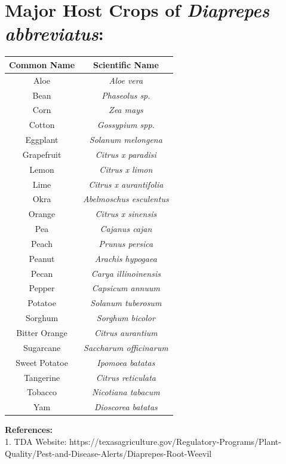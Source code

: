 \documentclass[12pt]{exam}
\begin{document}
\section*{Major Host Crops of \textit{Diaprepes abbreviatus}:} %
\begin{center}
\begin{tabular}{ |c|c| } 
 \hline
 \textbf{Common Name} & \textbf{Scientific Name }\\ 
 \hline
 Aloe & \textit{Aloe vera} \\ 
 \hline
 Bean & \textit{Phaseolus sp.} \\ 
 \hline
 Corn & \textit{Zea mays} \\ 
 \hline
 Cotton & \textit{Gossypium spp.} \\
 \hline
 Eggplant & \textit{Solanum melongena} \\ 
 \hline
 Grapefruit & \textit{Citrus x paradisi} \\ 
 \hline
 Lemon & \textit{Citrus x limon} \\ 
 \hline
 Lime & \textit{Citrus x aurantifolia} \\ 
 \hline
 Okra & \textit{Abelmoschus esculentus} \\
 \hline
 Orange & \textit{Citrus x sinensis} \\ 
 \hline
 Pea & \textit{Cajanus cajan} \\ 
 \hline
 Peach & \textit{Prunus persica} \\
 \hline
 Peanut & \textit{Arachis hypogaea} \\
 \hline
 Pecan & \textit{Carya illinoinensis} \\
 \hline
 Pepper & \textit{Capsicum annuum} \\
 \hline
 Potatoe & \textit{Solanum tuberosum} \\
 \hline
 Sorghum & \textit{Sorghum bicolor} \\
 \hline
 Bitter Orange & \textit{Citrus aurantium} \\ %
 \hline
 Sugarcane & \textit{Saccharum officinarum} \\
 \hline
 Sweet Potatoe & \textit{Ipomoea batatas} \\
 \hline
 Tangerine & \textit{Citrus reticulata} \\ %
 \hline
 Tobacco & \textit{Nicotiana tabacum} \\
 \hline
 Yam & \textit{Dioscorea batatas} \\
 \hline
\end{tabular}
\end{center}
\vspace{0.2in}

\textbf{References:}\\
1. TDA Website: https://texasagriculture.gov/Regulatory-Programs/Plant-Quality/Pest-and-Disease-Alerts/Diaprepes-Root-Weevil
\end{document}
